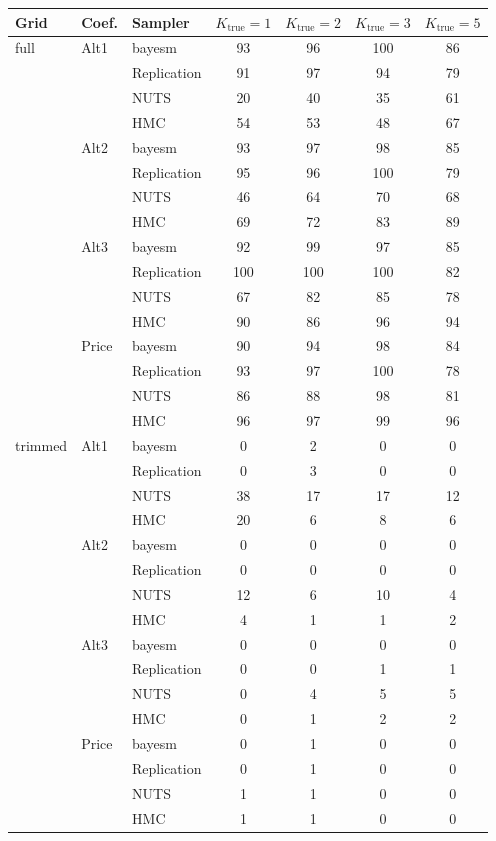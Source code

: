 \begin{tabular}{lllcccc}
\toprule
Grid & Coef. & Sampler & $K_{\text{true}}{=}1$ & $K_{\text{true}}{=}2$ & $K_{\text{true}}{=}3$ & $K_{\text{true}}{=}5$ \\
\midrule
full & Alt1 & bayesm & 93 & 96 & 100 & 86 \\
 &  & Replication & 91 & 97 & 94 & 79 \\
 &  & NUTS & 20 & 40 & 35 & 61 \\
 &  & HMC & 54 & 53 & 48 & 67 \\
 & Alt2 & bayesm & 93 & 97 & 98 & 85 \\
 &  & Replication & 95 & 96 & 100 & 79 \\
 &  & NUTS & 46 & 64 & 70 & 68 \\
 &  & HMC & 69 & 72 & 83 & 89 \\
 & Alt3 & bayesm & 92 & 99 & 97 & 85 \\
 &  & Replication & 100 & 100 & 100 & 82 \\
 &  & NUTS & 67 & 82 & 85 & 78 \\
 &  & HMC & 90 & 86 & 96 & 94 \\
 & Price & bayesm & 90 & 94 & 98 & 84 \\
 &  & Replication & 93 & 97 & 100 & 78 \\
 &  & NUTS & 86 & 88 & 98 & 81 \\
 &  & HMC & 96 & 97 & 99 & 96 \\
trimmed & Alt1 & bayesm & 0 & 2 & 0 & 0 \\
 &  & Replication & 0 & 3 & 0 & 0 \\
 &  & NUTS & 38 & 17 & 17 & 12 \\
 &  & HMC & 20 & 6 & 8 & 6 \\
 & Alt2 & bayesm & 0 & 0 & 0 & 0 \\
 &  & Replication & 0 & 0 & 0 & 0 \\
 &  & NUTS & 12 & 6 & 10 & 4 \\
 &  & HMC & 4 & 1 & 1 & 2 \\
 & Alt3 & bayesm & 0 & 0 & 0 & 0 \\
 &  & Replication & 0 & 0 & 1 & 1 \\
 &  & NUTS & 0 & 4 & 5 & 5 \\
 &  & HMC & 0 & 1 & 2 & 2 \\
 & Price & bayesm & 0 & 1 & 0 & 0 \\
 &  & Replication & 0 & 1 & 0 & 0 \\
 &  & NUTS & 1 & 1 & 0 & 0 \\
 &  & HMC & 1 & 1 & 0 & 0 \\
\bottomrule
\end{tabular}
